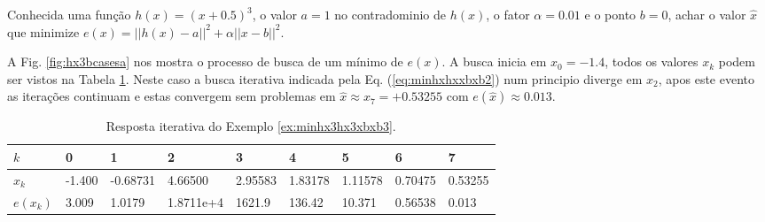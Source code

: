 \begin{example}\label{ex:minhx3hx3xbxb3}
Conhecida uma função $h(x)=(x+0.5)^3$, o valor $a=1$ no contradominio de $h(x)$,
o fator $\alpha=0.01$ e o ponto $b=0$,
achar o valor $\hat{x}$ que minimize $e(x)=||h(x)-a||^2+\alpha||x-b||^2$.
\end{example}
\begin{SolutionT}\label{sol:minhx3hx3xbxb3}
 A Fig. \ref{fig:hx3bcasesa} nos mostra o processo de busca de um mínimo
 de $e(x)$. 
 A busca inicia em $x_0=-1.4$,
 todos os valores $x_{k}$ podem ser vistos na Tabela \ref{tab:hx3bcases3}. 
Neste caso a busca iterativa indicada pela Eq. (\ref{eq:minhxhxxbxb2}) num principio diverge
em $x_2$, apos este evento as iterações continuam e estas convergem sem problemas 
em $\hat{x}\approx x_7=+0.53255$ com $e(\hat{x})\approx 0.013$.

\end{SolutionT}

\begin{table}[!h]
\centering
\begin{tabular}{|l|l|l|l|l|l|l|l|l|}
\hline
$k$      & 0 & 1 & 2 & 3 & 4 & 5 & 6 & 7 \\ \hline
$x_k$    & -1.400 & -0.68731 & 4.66500 & 2.95583 & 1.83178 & 1.11578 & 0.70475   & 0.53255 \\ \hline
$e(x_k)$ & 3.009 & 1.0179 & 1.8711e+4 & 1621.9 & 136.42 & 10.371 & 0.56538 & 0.013 \\ \hline
\end{tabular}
\caption{Resposta iterativa do Exemplo \ref{ex:minhx3hx3xbxb3}.}
\label{tab:hx3bcases3}
\end{table}

